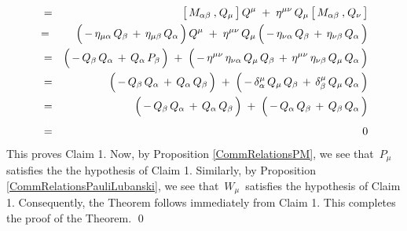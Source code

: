 \begin{eqnarray*}
& = &
	\left[\,
		M_{\alpha\beta}
		\,\overset{{\color{white}1}}{,}\,
		Q_{\mu}
		\,\right]
	Q^{\mu}
	\;+\;
	\eta^{\mu\nu}\,Q_{\mu}
	\left[\,
		M_{\alpha\beta}
		\,\overset{{\color{white}1}}{,}\,
		Q_{\nu}
		\,\right]
\\
& {\color{black}=} &
	\left(\,
		-\,\eta_{\mu\alpha}\,Q_{\beta}
		\,\overset{{\color{white}.}}{+}\,
		\eta_{\mu\beta}\,Q_{\alpha}
		\,\right)
	Q^{\mu}
	\;+\;
	\eta^{\mu\nu}\,Q_{\mu}
	\left(\,
		-\,\eta_{\nu\alpha}\,Q_{\beta}
		\,\overset{{\color{white}.}}{+}\,
		\eta_{\nu\beta}\,Q_{\alpha}
		\,\right)
\\
& = &
	\left(\,
		-\,Q_{\beta}\,Q_{\alpha}
		\,\overset{{\color{white}.}}{+}\,
		Q_{\alpha}\,P_{\beta}
		\,\right)
	\;+\;
	\left(\,
		-\,\eta^{\mu\nu}\,\eta_{\nu\alpha}\,Q_{\mu}\,Q_{\beta}
		\,\overset{{\color{white}.}}{+}\,
		\eta^{\mu\nu}\,\eta_{\nu\beta}\,Q_{\mu}\,Q_{\alpha}
		\,\right)
\\
& = &
	\left(\,
		-\,Q_{\beta}\,Q_{\alpha}
		\,\overset{{\color{white}.}}{+}\,
		Q_{\alpha}\,Q_{\beta}
		\,\right)
	\;+\;
	\left(\,
		-\,\delta^{\mu}_{\alpha}\,Q_{\mu}\,Q_{\beta}
		\,\overset{{\color{white}.}}{+}\,
		\delta^{\mu}_{\beta}\,Q_{\mu}\,Q_{\alpha}
		\,\right)
\\
& = &
	\left(\,
		-\,Q_{\beta}\,Q_{\alpha}
		\,\overset{{\color{white}.}}{+}\,
		Q_{\alpha}\,Q_{\beta}
		\,\right)
	\;+\;
	\left(\,
		-\,Q_{\alpha}\,Q_{\beta}
		\,\overset{{\color{white}.}}{+}\,
		Q_{\beta}\,Q_{\alpha}
		\,\right)
\\
& \overset{{\color{white}\textnormal{\small$1$}}}{=} &
	0
\end{eqnarray*}
This proves Claim 1.
\vskip 0.3cm
\noindent
Now, by Proposition \ref{CommRelationsPM},
we see that \,$P_{\mu}$\, satisfies the the hypothesis of Claim 1.
Similarly, by Proposition \ref{CommRelationsPauliLubanski},
we see that \,$W_{\mu}$\, satisfies the hypothesis of Claim 1.
Consequently, the Theorem follows immediately from Claim 1.
This completes the proof of the Theorem.
\qed


